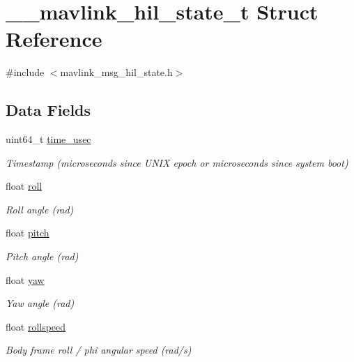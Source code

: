 \hypertarget{struct____mavlink__hil__state__t}{\section{\+\_\+\+\_\+mavlink\+\_\+hil\+\_\+state\+\_\+t Struct Reference}
\label{struct____mavlink__hil__state__t}
}


{\ttfamily \#include $<$mavlink\+\_\+msg\+\_\+hil\+\_\+state.\+h$>$}

\subsection*{Data Fields}
\begin{DoxyCompactItemize}
\item 
uint64\+\_\+t \hyperlink{struct____mavlink__hil__state__t_a19f9efdaaddd6d9699f8225bf5a4d4ef}{time\+\_\+usec}
\begin{DoxyCompactList}\small\item\em Timestamp (microseconds since U\+N\+I\+X epoch or microseconds since system boot) \end{DoxyCompactList}\item 
float \hyperlink{struct____mavlink__hil__state__t_a33202a922fda8d956b7ce78814d82558}{roll}
\begin{DoxyCompactList}\small\item\em Roll angle (rad) \end{DoxyCompactList}\item 
float \hyperlink{struct____mavlink__hil__state__t_a734b8ba645687e5673c599c4a9a950f1}{pitch}
\begin{DoxyCompactList}\small\item\em Pitch angle (rad) \end{DoxyCompactList}\item 
float \hyperlink{struct____mavlink__hil__state__t_aa7a7dfae39434c0c51492cb2d5614863}{yaw}
\begin{DoxyCompactList}\small\item\em Yaw angle (rad) \end{DoxyCompactList}\item 
float \hyperlink{struct____mavlink__hil__state__t_a308aa515448a4d8d25131ce7c0f3254d}{rollspeed}
\begin{DoxyCompactList}\small\item\em Body frame roll / phi angular speed (rad/s) \end{DoxyCompactList}\item 

\end{DoxyCompactItemize}
